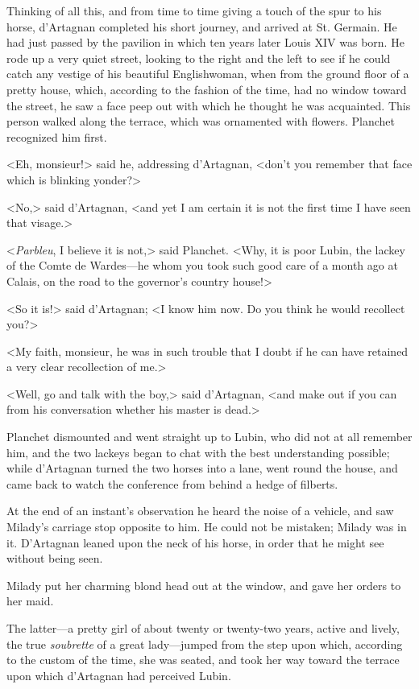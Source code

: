 Thinking of all this, and from time to time giving a touch of the spur to his horse, d'Artagnan completed his short journey, and arrived at St. Germain. He had just passed by the pavilion in which ten years later Louis XIV was born. He rode up a very quiet street, looking to the right and the left to see if he could catch any vestige of his beautiful Englishwoman, when from the ground floor of a pretty house, which, according to the fashion of the time, had no window toward the street, he saw a face peep out with which he thought he was acquainted. This person walked along the terrace, which was ornamented with flowers. Planchet recognized him first. 

<Eh, monsieur!> said he, addressing d'Artagnan, <don't you remember that face which is blinking yonder?> 

<No,> said d'Artagnan, <and yet I am certain it is not the first time I have seen that visage.> 

<\textit{Parbleu}, I believe it is not,> said Planchet. <Why, it is poor Lubin, the lackey of the Comte de Wardes---he whom you took such good care of a month ago at Calais, on the road to the governor's country house!> 

<So it is!> said d'Artagnan; <I know him now. Do you think he would recollect you?> 

<My faith, monsieur, he was in such trouble that I doubt if he can have retained a very clear recollection of me.> 

<Well, go and talk with the boy,> said d'Artagnan, <and make out if you can from his conversation whether his master is dead.> 

Planchet dismounted and went straight up to Lubin, who did not at all remember him, and the two lackeys began to chat with the best understanding possible; while d'Artagnan turned the two horses into a lane, went round the house, and came back to watch the conference from behind a hedge of filberts. 

At the end of an instant's observation he heard the noise of a vehicle, and saw Milady's carriage stop opposite to him. He could not be mistaken; Milady was in it. D'Artagnan leaned upon the neck of his horse, in order that he might see without being seen. 

Milady put her charming blond head out at the window, and gave her orders to her maid. 

The latter---a pretty girl of about twenty or twenty-two years, active and lively, the true \textit{soubrette} of a great lady---jumped from the step upon which, according to the custom of the time, she was seated, and took her way toward the terrace upon which d'Artagnan had perceived Lubin. 

